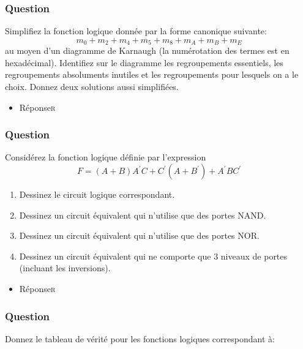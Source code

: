 \documentclass[11pt]{article}
\begin{document}
\subsubsection*{Question}
\label{sec:org1de5ba2}
Simplifiez la fonction logique donnée par la forme canonique
  suivante:
  $$
    m_0 + m_2 + m_4 + m_5 + m_8 + m_A + m_B + m_E
    $$
  au
  moyen d'un diagramme de Karnaugh (la numérotation des termes est en
  hexadécimal). Identifiez sur le diagramme les regroupements
  essentiels, les regroupements absoluments inutiles et les
  regroupements pour lesquels on a le choix. Donnez deux solutions
  aussi simplifiées.

\begin{itemize}
\item Réponse\hfill{}\textsc{r}
\label{sec:org55992f5}
\end{itemize}

\subsubsection*{Question}
\label{sec:orgeb01c3d}
Considérez la fonction logique définie par l'expression
  $$
    F =
      (A + B) A^{\prime} C + C^{\prime}(A+B^{\prime}) + A^{\prime}B
      C^{\prime}
    $$

\begin{enumerate}
\item Dessinez le circuit logique correspondant.

\item Dessinez un circuit équivalent qui n'utilise que des portes
NAND.

\item Dessinez un circuit équivalent qui n'utilise que des portes
NOR.

\item Dessinez un circuit équivalent qui ne comporte que 3 niveaux de
portes (incluant les inversions).
\end{enumerate}

\begin{itemize}
\item Réponse\hfill{}\textsc{r}
\label{sec:org98b4cb8}
\end{itemize}

\subsubsection*{Question}
\label{sec:orgeefa236}
Donnez le tableau de vérité pour les fonctions logiques correspondant
  à:
\end{document}
